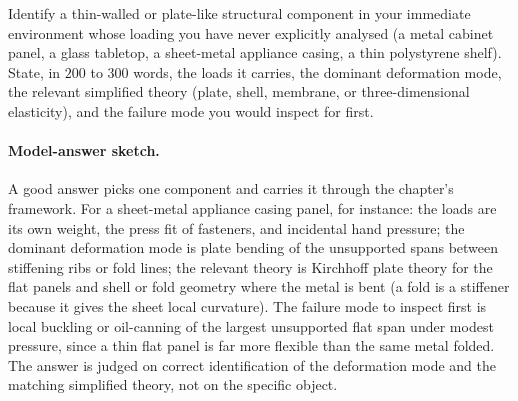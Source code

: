 \begin{exercise}
Identify a thin-walled or plate-like structural component in
your immediate environment whose loading you have never explicitly
analysed (a metal cabinet panel, a glass tabletop, a sheet-metal
appliance casing, a thin polystyrene shelf). State, in $200$ to
$300$ words, the loads it carries, the dominant deformation mode,
the relevant simplified theory (plate, shell, membrane, or
three-dimensional elasticity), and the failure mode you would
inspect for first.

\paragraph{Model-answer sketch.} A good answer picks one component and
carries it through the chapter's framework. For a sheet-metal appliance
casing panel, for instance: the loads are its own weight, the press
fit of fasteners, and incidental hand pressure; the dominant
deformation mode is plate bending of the unsupported spans between
stiffening ribs or fold lines; the relevant theory is Kirchhoff plate
theory for the flat panels and shell or fold geometry where the metal
is bent (a fold is a stiffener because it gives the sheet local
curvature). The failure mode to inspect first is local buckling or
oil-canning of the largest unsupported flat span under modest pressure,
since a thin flat panel is far more flexible than the same metal folded.
The answer is judged on correct identification of the deformation mode
and the matching simplified theory, not on the specific object.
\end{exercise}
